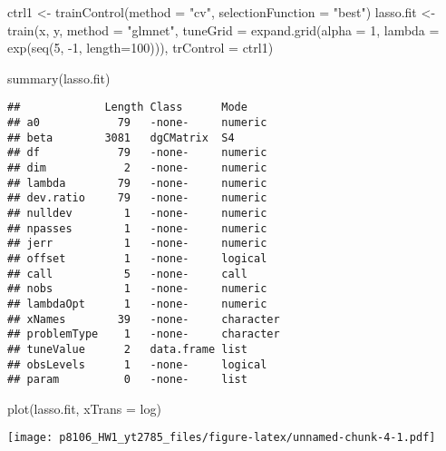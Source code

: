 \documentclass[
]{article}
\newenvironment{Shaded}{\begin{snugshade}}{\end{snugshade}}
\newcommand{\AttributeTok}[1]{\textcolor[rgb]{0.77,0.63,0.00}{#1}}
\newcommand{\DecValTok}[1]{\textcolor[rgb]{0.00,0.00,0.81}{#1}}
\newcommand{\FunctionTok}[1]{\textcolor[rgb]{0.00,0.00,0.00}{#1}}
\newcommand{\NormalTok}[1]{#1}
\newcommand{\OtherTok}[1]{\textcolor[rgb]{0.56,0.35,0.01}{#1}}
\newcommand{\SpecialCharTok}[1]{\textcolor[rgb]{0.00,0.00,0.00}{#1}}
\newcommand{\StringTok}[1]{\textcolor[rgb]{0.31,0.60,0.02}{#1}}
\begin{document}
\begin{Shaded}
\begin{Highlighting}[]
\NormalTok{ctrl1 }\OtherTok{\textless{}{-}} \FunctionTok{trainControl}\NormalTok{(}\AttributeTok{method =} \StringTok{"cv"}\NormalTok{, }\AttributeTok{selectionFunction =} \StringTok{"best"}\NormalTok{)}
\NormalTok{lasso.fit }\OtherTok{\textless{}{-}} \FunctionTok{train}\NormalTok{(x, y,}
                   \AttributeTok{method =} \StringTok{"glmnet"}\NormalTok{,}
                   \AttributeTok{tuneGrid =} \FunctionTok{expand.grid}\NormalTok{(}\AttributeTok{alpha =} \DecValTok{1}\NormalTok{, }
                                          \AttributeTok{lambda =} \FunctionTok{exp}\NormalTok{(}\FunctionTok{seq}\NormalTok{(}\DecValTok{5}\NormalTok{, }\SpecialCharTok{{-}}\DecValTok{1}\NormalTok{, }\AttributeTok{length=}\DecValTok{100}\NormalTok{))),}
                   \AttributeTok{trControl =}\NormalTok{ ctrl1)}

\FunctionTok{summary}\NormalTok{(lasso.fit)}
\end{Highlighting}
\end{Shaded}

\begin{verbatim}
##             Length Class      Mode     
## a0            79   -none-     numeric  
## beta        3081   dgCMatrix  S4       
## df            79   -none-     numeric  
## dim            2   -none-     numeric  
## lambda        79   -none-     numeric  
## dev.ratio     79   -none-     numeric  
## nulldev        1   -none-     numeric  
## npasses        1   -none-     numeric  
## jerr           1   -none-     numeric  
## offset         1   -none-     logical  
## call           5   -none-     call     
## nobs           1   -none-     numeric  
## lambdaOpt      1   -none-     numeric  
## xNames        39   -none-     character
## problemType    1   -none-     character
## tuneValue      2   data.frame list     
## obsLevels      1   -none-     logical  
## param          0   -none-     list
\end{verbatim}

\begin{Shaded}
\begin{Highlighting}[]
\FunctionTok{plot}\NormalTok{(lasso.fit, }\AttributeTok{xTrans =}\NormalTok{ log)}
\end{Highlighting}
\end{Shaded}

\texttt{[image: p8106\_HW1\_yt2785\_files/figure-latex/unnamed-chunk-4-1.pdf]}
\end{document}

